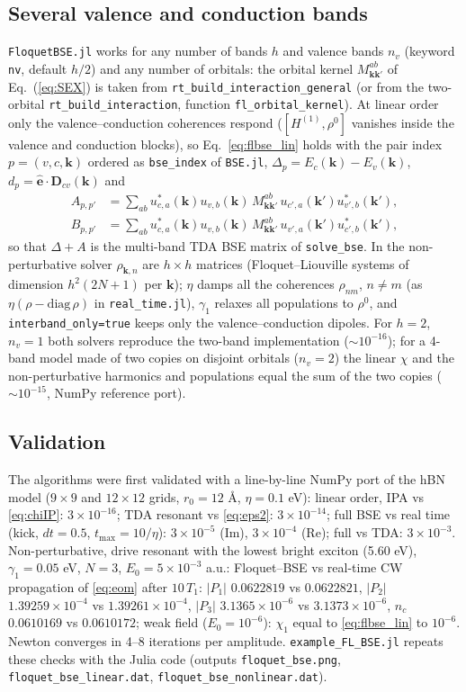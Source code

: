 \documentclass[11pt,a4paper]{article}
\newcommand{\kk}{\bm{k}}
\newcommand{\hate}{\hat{\bm{e}}}
\newcommand{\code}[1]{\texttt{#1}}
\begin{document}
\subsection{Several valence and conduction bands}
\code{FloquetBSE.jl} works for any number of bands $h$ and valence bands $n_v$ (keyword \code{nv}, default $h/2$) and any number of
orbitals: the orbital kernel $M^{ab}_{\kk\kk'}$ of Eq.~(\ref{eq:SEX}) is taken from \code{rt\_build\_interaction\_general} (or from the two-orbital
\code{rt\_build\_interaction}, function \code{fl\_orbital\_kernel}). At linear order only the valence--conduction coherences respond
($[H^{(1)},\rho^0]$ vanishes inside the valence and conduction blocks), so Eq.~\eqref{eq:flbse_lin} holds with the pair index
$p=(v,c,\kk)$ ordered as \code{bse\_index} of \code{BSE.jl}, $\Delta_p=E_c(\kk)-E_v(\kk)$, $d_p=\hate\cdot\bm D_{cv}(\kk)$ and
\begin{align}
A_{p,p'}&=\sum_{ab}u^*_{c,a}(\kk)u_{v,b}(\kk)\,M^{ab}_{\kk\kk'}\,u_{c',a}(\kk')u^*_{v',b}(\kk'),\\
B_{p,p'}&=\sum_{ab}u^*_{c,a}(\kk)u_{v,b}(\kk)\,M^{ab}_{\kk\kk'}\,u_{v',a}(\kk')u^*_{c',b}(\kk'),
\end{align}
so that $\Delta+A$ is the multi-band TDA BSE matrix of \code{solve\_bse}. In the non-perturbative solver $\rho_{\kk,n}$ are $h\times h$ matrices
(Floquet--Liouville systems of dimension $h^2(2N+1)$ per $\kk$); $\eta$ damps all the coherences $\rho_{nm}$, $n\neq m$ (as
$\eta(\rho-\mathrm{diag}\,\rho)$ in \code{real\_time.jl}), $\gamma_1$ relaxes all populations to $\rho^0$, and \code{interband\_only=true} keeps only
the valence--conduction dipoles. For $h=2$, $n_v=1$ both solvers reproduce the two-band implementation ($\sim10^{-16}$); for a 4-band model made of
two copies on disjoint orbitals ($n_v=2$) the linear $\chi$ and the non-perturbative harmonics and populations equal the sum of the two copies
($\sim10^{-15}$, NumPy reference port).

\subsection{Validation}
The algorithms were first validated with a line-by-line NumPy port of the hBN model ($9\times9$ and $12\times12$ grids, $r_0=12$ \AA, $\eta=0.1$ eV):
linear order, IPA vs \eqref{eq:chiIP}: $3\times10^{-16}$; TDA resonant vs \eqref{eq:eps2}: $3\times10^{-14}$; full BSE vs real time (kick, $dt=0.5$,
$t_{\max}=10/\eta$): $3\times10^{-5}$ (Im), $3\times10^{-4}$ (Re); full vs TDA: $3\times10^{-3}$. Non-perturbative, drive resonant with the lowest
bright exciton (5.60 eV), $\gamma_1=0.05$ eV, $N=3$, $E_0=5\times10^{-3}$ a.u.: Floquet--BSE vs real-time CW propagation of \eqref{eq:eom} after
$10\,T_1$: $|P_1|$ $0.0622819$ vs $0.0622821$, $|P_2|$ $1.39259\times10^{-4}$ vs $1.39261\times10^{-4}$, $|P_3|$ $3.1365\times10^{-6}$ vs $3.1373\times10^{-6}$,
$n_c$ $0.0610169$ vs $0.0610172$; weak field ($E_0=10^{-6}$): $\chi_1$ equal to \eqref{eq:flbse_lin} to $10^{-6}$. Newton converges in 4--8
iterations per amplitude. \code{example\_FL\_BSE.jl} repeats these checks with the Julia code (outputs \code{floquet\_bse.png},
\code{floquet\_bse\_linear.dat}, \code{floquet\_bse\_nonlinear.dat}).
\end{document}
